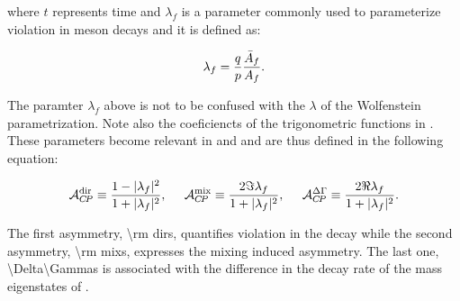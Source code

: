 \noindent where $t$ represents time and $\lambda_f$ is a parameter commonly used to parameterize
\CP violation in meson decays and it is defined as:

\begin{equation}
  \centering
  \lambda_{f} = \frac{q}{p} \frac{\bar{A}_f}{A_f}. %
\label{lambda_cpv}
\end{equation}

\noindent The paramter $\lambda_f$ above is not to be confused with the $\lambda$ of the
Wolfenstein parametrization. Note also the coeficiencts of the trigonometric functions in
. These parameters become relevant in 
and  and are thus defined in the following equation:

\begin{equation}
  \centering
  \Acp{\rm dir}      \equiv \frac{ 1-|\lambda_f|^2} {1 + |\lambda_f|^2},\;\;\;\;\;
  \Acp{\rm mix}      \equiv \frac{ 2 \Im\lambda_f} {1 + |\lambda_f|^2},\;\;\;\;\;
  \Acp{\Delta\Gamma} \equiv \frac{ 2 \Re\lambda_f} {1 + |\lambda_f|^2}.
\label{cp_asym_lambda}
\end{equation}

\noindent The first asymmetry, \Acp{\rm dir}, quantifies \CP violation in the decay while the
second asymmetry, \Acp{\rm mix}, expresses the mixing induced \CP asymmetry. The last one,
\Acp{\Delta\Gamma} is associated with the difference in the decay rate of the mass eigenstates of .
